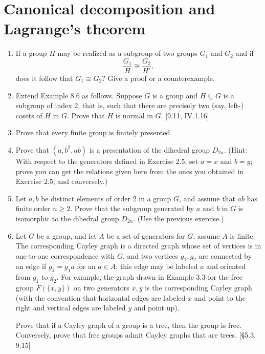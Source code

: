 \section{Canonical decomposition and Lagrange's theorem}
\begin{enumerate}
    \item If a group $H$ may be realized as a subgroup of two groups $G_1$ and $G_2$ and if
          \[ \frac{G_1}{H} \cong \frac{G_2}{H'}, \]
          does it follow that $G_1 \cong G_2$? Give a proof or a counterexample.

    \item Extend Example 8.6 as follows. Suppose $G$ is a group and $H \subseteq G$ is a subgroup of index 2, that is, such that there are precisely two (say, left-) cosets of $H$ in $G$. Prove that $H$ is normal in $G$. [9.11, IV.1.16]

    \item Prove that every finite group is finitely presented.

    \item Prove that $(a, b^2, ab)$ is a presentation of the dihedral group $D_{2n}$. (Hint: With respect to the generators defined in Exercise 2.5, set $a=x$ and $b=y$; prove you can get the relations given here from the ones you obtained in Exercise 2.5, and conversely.)

    \item Let $a, b$ be distinct elements of order 2 in a group $G$, and assume that $ab$ has finite order $n \ge 2$. Prove that the subgroup generated by $a$ and $b$ in $G$ is isomorphic to the dihedral group $D_{2n}$. (Use the previous exercise.)

    \item Let $G$ be a group, and let $A$ be a set of generators for $G$; assume $A$ is finite. The corresponding Cayley graph is a directed graph whose set of vertices is in one-to-one correspondence with $G$, and two vertices $g_1, g_2$ are connected by an edge if $g_2 = g_1 a$ for an $a \in A$; this edge may be labeled $a$ and oriented from $g_1$ to $g_2$. For example, the graph drawn in Example 3.3 for the free group $F(\{x,y\})$ on two generators $x, y$ is the corresponding Cayley graph (with the convention that horizontal edges are labeled $x$ and point to the right and vertical edges are labeled $y$ and point up).

          Prove that if a Cayley graph of a group is a tree, then the group is free. Conversely, prove that free groups admit Cayley graphs that are trees. [\S5.3, 9.15]


\end{enumerate}
